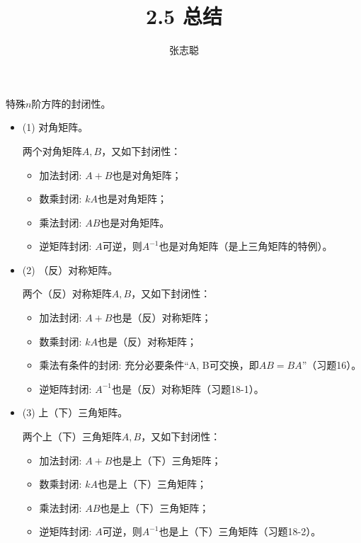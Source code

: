 \documentclass{article}
\begin{document}
\title{2.5 总结}
\author{张志聪}
\maketitle

\begin{zremark}
  特殊$n$阶方阵的封闭性。
\end{zremark}

\begin{itemize}
  \item (1) 对角矩阵。

        两个对角矩阵$A, B$，又如下封闭性：
        \begin{itemize}
          \item 加法封闭: $A + B$也是对角矩阵；
          \item 数乘封闭: $kA$也是对角矩阵；
          \item 乘法封闭: $AB$也是对角矩阵。
          \item 逆矩阵封闭: $A$可逆，则$A^{-1}$也是对角矩阵（是上三角矩阵的特例）。
        \end{itemize}


  \item (2) （反）对称矩阵。

        两个（反）对称矩阵$A, B$，又如下封闭性：
        \begin{itemize}
          \item 加法封闭: $A + B$也是（反）对称矩阵；
          \item 数乘封闭: $kA$也是（反）对称矩阵；
          \item 乘法有条件的封闭: 充分必要条件“A, B可交换，即$AB = BA$”（习题16）。
          \item 逆矩阵封闭: $A^{-1}$也是（反）对称矩阵（习题18-1）。
        \end{itemize}

  \item (3) 上（下）三角矩阵。

        两个上（下）三角矩阵$A, B$，又如下封闭性：
        \begin{itemize}
          \item 加法封闭: $A + B$也是上（下）三角矩阵；
          \item 数乘封闭: $kA$也是上（下）三角矩阵；
          \item 乘法封闭: $AB$也是上（下）三角矩阵；
          \item 逆矩阵封闭: $A$可逆，则$A^{-1}$也是上（下）三角矩阵（习题18-2）。
        \end{itemize}
\end{itemize}
\end{document}
